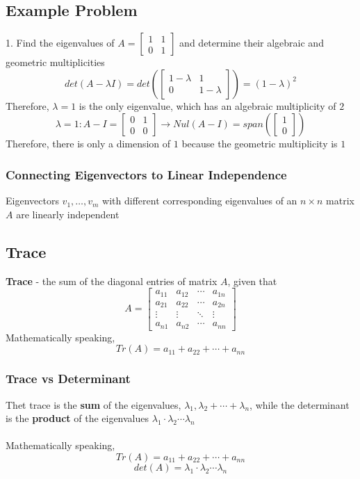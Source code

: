 \begin{enumerate}
\subsection{Example Problem}
1. Find the eigenvalues of $A = \begin{bmatrix} 1 & 1 \\ 
0 & 1 \end{bmatrix}$ and determine their 
algebraic and geometric multiplicities
\[
  det(A - \lambda I) = det(\begin{bmatrix} 1 - \lambda & 1 \\ 
  0 & 1 - \lambda \end{bmatrix}) = (1 - \lambda)^2
\]
Therefore, $\lambda = 1$ is the only eigenvalue, which has an 
algebraic multiplicity of $2$ 
\[
  \lambda = 1: A - I = \begin{bmatrix} 0 & 1 \\ 0 & 0 \end{bmatrix}
  \rightarrow Nul(A - I) = span(\begin{bmatrix} 1 \\ 0 \end{bmatrix})
\]
Therefore, there is only a dimension of $1$ because the geometric 
multiplicity is $1$
\subsubsection{Connecting Eigenvectors to Linear Independence}
Eigenvectors $v_1, \dots, v_m$ with different corresponding eigenvalues 
of an $n \times n$ matrix $A$ are linearly 
independent
\subsection{Trace}
\textbf{Trace} - the sum of the diagonal entries of matrix $A$, given 
  that \[A = \begin{bmatrix} a_{11} & a_{12} & \cdots & a_{1n} \\
    a_{21} & a_{22} & \cdots & a_{2n} \\ \vdots & \vdots & \ddots 
           & \vdots \\ a_{n1} & a_{n2} & \cdots & a_{nn} \end{bmatrix}\]
Mathematically speaking,
\[
  Tr(A) = a_{11} + a_{22} + \cdots + a_{nn}
\]
\subsubsection{Trace vs Determinant}
Thet trace is the \textbf{sum} of the eigenvalues, $\lambda_1, \lambda_2 + \cdots + \lambda_n$, while the determinant is the \textbf{product}
of the eigenvalues $\lambda_1 \cdot \lambda_2 \cdots \lambda_n$ \\\\
Mathematically speaking, 
\[
  Tr(A) = a_{11} + a_{22} + \cdots + a_{nn}
\]
\[
  det(A) = \lambda_1 \cdot \lambda_2 \cdots \lambda_n
\]

\end{enumerate}
